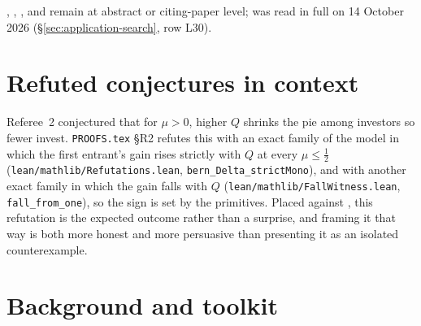 \documentclass[11pt,a4paper]{article}
\begin{document}
\citet{ChungLee2017}, \citet{ColeMailathPostlewaite1998},
\citet{Postlewaite1998}, \citet{Frank1985} and
\citet{BilanciniBoncinelli2012} remain at abstract or citing-paper level;
\citet{FernandezGali1999} was read in full on 14 October 2026
(\S\ref{sec:application-search}, row L30).

\section{Refuted conjectures in context}
\label{sec:refuted}

Referee~2 conjectured that for $\mu > 0$, higher $Q$ shrinks the pie among
investors so fewer invest. \texttt{PROOFS.tex} \S R2 refutes this with an
exact family of the model in which the first entrant's gain rises strictly
with $Q$ at every $\mu\le\tfrac12$ (\texttt{lean/mathlib/Refutations.lean},
\texttt{bern\_Delta\_strictMono}), and with another exact family in which the
gain falls with $Q$ (\texttt{lean/mathlib/FallWitness.lean},
\texttt{fall\_from\_one}), so the sign is set by the primitives. Placed
against \citet{RyvkinDrugov2020}, this refutation is the expected outcome rather
than a surprise, and framing it that way is both more honest and more
persuasive than presenting it as an isolated counterexample.

\section{Background and toolkit}
\end{document}

